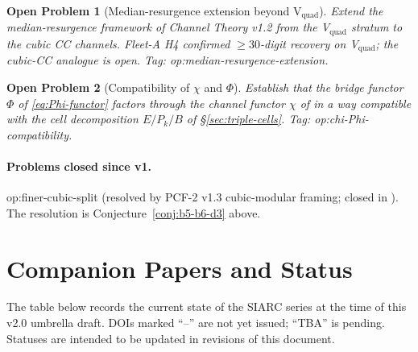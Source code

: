 \documentclass[11pt,a4paper]{article}
\newtheorem{problem}{Open Problem}
\theoremstyle{definition}
\theoremstyle{remark}
\begin{document}
\begin{problem}[Median-resurgence extension beyond V$_{\mathrm{quad}}$]
\label{prob:median-resurgence-extension}
Extend the median-resurgence framework of Channel Theory v1.2
\cite{CT} from the V$_{\mathrm{quad}}$ stratum to the cubic
CC channels. Fleet-A H4 confirmed $\geq 30$-digit recovery on
V$_{\mathrm{quad}}$; the cubic-CC analogue is open. Tag:
\textsf{op:median-resurgence-extension}.
\end{problem}

\begin{problem}[Compatibility of $\chi$ and $\Phi$]
\label{prob:chi-Phi-compatibility}
Establish that the bridge functor $\Phi$ of \eqref{eq:Phi-functor}
factors through the channel functor $\chi$ of \cite{CT} in a way
compatible with the cell decomposition $E / P_k / B$ of
\S\ref{sec:triple-cells}. Tag: \textsf{op:chi-Phi-compatibility}.
\end{problem}

\paragraph{Problems closed since v1.}
\textsf{op:finer-cubic-split} (resolved by PCF-2 v1.3 cubic-modular
framing; closed in \cite{PCF2}). The resolution is
Conjecture~\ref{conj:b5-b6-d3} above.

\section{Companion Papers and Status}
\label{sec:companions}

The table below records the current state of the SIARC series at the
time of this v2.0 umbrella draft. DOIs marked ``--'' are not yet
issued; ``TBA'' is pending. Statuses are intended to be updated in
revisions of this document.
\end{document}
